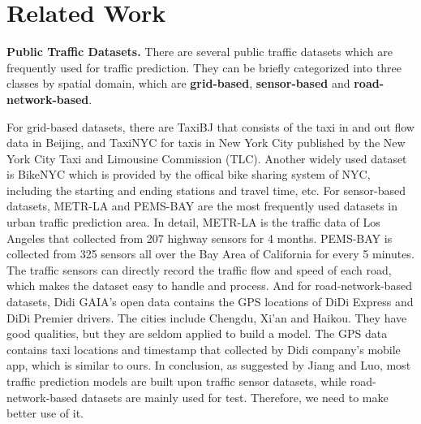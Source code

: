 
\section{Related Work}
\textbf{Public Traffic Datasets.} There are several public traffic datasets which are frequently used for traffic prediction. They can be briefly categorized into three classes by spatial domain, which are \textbf{grid-based}, \textbf{sensor-based} and \textbf{road-network-based}.

For grid-based datasets, there are TaxiBJ\cite{taxibj} that consists of the taxi in and out flow data in Beijing, and TaxiNYC for taxis in New York City published by the New York City Taxi and Limousine Commission (TLC). Another widely used dataset is BikeNYC which is provided by the offical bike sharing system of NYC, including the starting and ending stations and travel time, etc. For sensor-based datasets, METR-LA\cite{DCRNN} and PEMS-BAY are the most frequently used datasets in urban traffic prediction area. In detail, METR-LA is the traffic data of Los Angeles that collected from 207 highway sensors for 4 months. PEMS-BAY is collected from 325 sensors all over the Bay Area of California for every 5 minutes. The traffic sensors can directly record the traffic flow and speed of each road, which makes the dataset easy to handle and process. And for road-network-based datasets, Didi GAIA's open data contains the GPS locations of DiDi Express and DiDi Premier drivers. The cities include Chengdu, Xi'an and Haikou. They have good qualities, but they are seldom applied to build a model. The GPS data contains taxi locations and timestamp that collected by Didi company's mobile app, which is similar to ours. In conclusion, as suggested by Jiang and Luo\cite{surveyGNN}, most traffic prediction models are built upon traffic sensor datasets, while road-network-based datasets are mainly used for test. Therefore, we need to make better use of it.

\vspace{\baselineskip}


